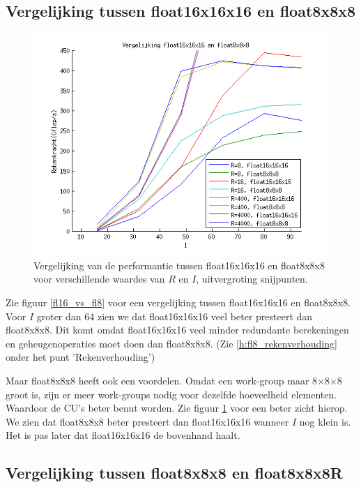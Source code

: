 \subsection{Vergelijking tussen float16x16x16 en float8x8x8}

\begin{figure}[h!]
\centering
\includegraphics{fl16_vs_fl8_klein}
\caption{\label{fl16_vs_fl8_klein} Vergelijking van de performantie tussen float16x16x16 en float8x8x8 voor verschillende waardes van $R$ en $I$, uitvergroting snijpunten.}
\end{figure}

Zie figuur \ref{fl16_vs_fl8} voor een vergelijking tussen float16x16x16 en float8x8x8. Voor $I$ groter dan 64 zien we dat float16x16x16 veel beter presteert dan float8x8x8. Dit komt omdat float16x16x16 veel minder redundante berekeningen en geheugenoperaties moet doen dan float8x8x8. (Zie \ref{h:fl8_rekenverhouding} onder het punt 'Rekenverhouding')

Maar float8x8x8 heeft ook een voordelen. Omdat een work-group maar 8$\times$8$\times$8 groot is, zijn er meer work-groups nodig voor dezelfde hoeveelheid elementen. Waardoor de CU's beter benut worden. Zie figuur \ref{fl16_vs_fl8_klein} voor een beter zicht hierop. We zien dat float8x8x8 beter presteert dan float16x16x16 wanneer $I$ nog klein is. Het is pas later dat float16x16x16 de bovenhand haalt.

\subsection{Vergelijking tussen float8x8x8 en float8x8x8R}

